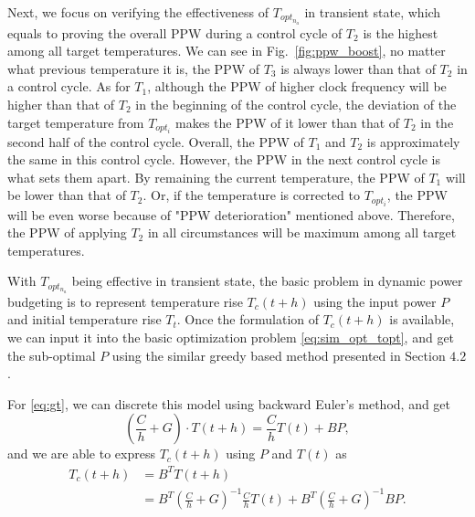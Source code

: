 

Next, we focus on verifying the effectiveness of $T_{opt_{n_{a}}}$ in transient state, which equals to proving the overall PPW during a control cycle of $T_{2}$ is the highest among all target temperatures. We can see in Fig.~\ref{fig:ppw_boost}, no matter what previous temperature it is, the PPW of $T_{3}$ is always lower than that of $T_{2}$ in a control cycle. As for $T_{1}$, although the PPW of higher clock frequency will be higher than that of $T_{2}$ in the beginning of the control cycle, the deviation of the target temperature from $T_{opt_{i}}$ makes the PPW of it lower than that of $T_{2}$ in the second half of the control cycle. Overall, the PPW of $T_{1}$ and $T_{2}$ is approximately the same in this control cycle. However, the PPW in the next control cycle is what sets them apart. By remaining the current temperature, the PPW of $T_{1}$ will be lower than that of $T_{2}$. Or, if the temperature is corrected to $T_{opt_{i}}$, the PPW will be even worse because of "PPW deterioration" mentioned above. Therefore, the PPW of applying $T_{2}$ in all circumstances will be maximum among all target temperatures.

With $T_{opt_{n_{a}}}$ being effective in transient state, the basic problem in dynamic power budgeting is to represent temperature rise $T_{c}(t+h)$ using the input power $P$ and initial temperature rise $T_{t}$. Once the formulation of $T_{c}(t+h)$ is available, we can input it into the basic optimization problem \eqref{eq:sim_opt_topt}, and get the sub-optimal $P$ using the similar greedy based method presented in Section $4.2$.

For \eqref{eq:gt}, we can discrete this model using backward Euler's method, and get
\begin{equation}\label{eq:discrete_gt}
(\frac{C}{h}+G)\cdot T(t+h)=\frac{C}{h}T(t)+BP,
\end{equation}
and we are able to express $T_{c}(t+h)$ using $P$ and $T(t)$ as
\begin{equation}\label{eq:discrete_tc}
  \begin{split}
T_{c}(t+h)&=B^{T}T(t+h)\\
&=B^{T}(\frac{C}{h}+G)^{-1}\frac{C}{h}T(t)+B^{T}(\frac{C}{h}+G)^{-1}BP.
  \end{split}
\end{equation}

